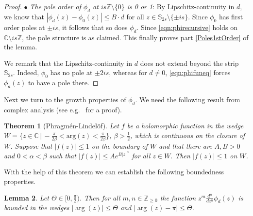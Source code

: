 \documentclass[12pt]{article}
\theoremstyle{plain}
\newtheorem{theorem}{Theorem}
\newtheorem{lemma}[theorem]{Lemma}
\theoremstyle{definition}
\numberwithin{equation}{section}
\numberwithin{theorem}{section}
\newcommand\Zb            {\mathbb{Z}}
\begin{document}
\begin{proof}
\medskip

\noindent
$\bullet$ {\em The pole order of $\phi_d$ at $is\Zb \setminus \{0\}$ is 0 or 1}:
By Lipschitz-continuity in $d$, we know that $|\phi_d(z)-\phi_0(z) |\leq B\cdot d$ for all $z \in \mathbb{S}_{2s} \setminus \{ \pm is\}$. Since $\phi_0$ has first order poles at $\pm is$, it follows that so does $\phi_d$. 
Since \eqref{eqn:phirecursive} holds on $\mathbb{C} \setminus is\mathbb{Z}$, the pole structure is as claimed.
This finally proves part \ref{Poles1stOrder} of the lemma.

We remark that the Lipschitz-continuity in $d$ does not extend beyond the strip $\mathbb{S}_{2s}$. Indeed, 
$\phi_0$ has no pole at $\pm 2is$, whereas for $d\neq 0$,  \eqref{eqn:phifuneq} forces $\phi_d(z)$ to have a pole there. 
\end{proof}

Next we turn to the growth properties of $\phi_d$. We need the following result from complex analysis (see e.g.\ \cite[Ch.\,4,\,Thm.\,3.4]{SteinShakarchi} for a proof).

\begin{theorem}[Phragm\'en-Lindel\"of]\label{phrag-lind}
Let $f$ be a holomorphic function in the wedge $W = \{ z \in \mathbb{C} \,|\, -\tfrac\pi{2\beta} < \mathrm{arg}(z) < \tfrac\pi{2\beta} \}$, $\beta>\tfrac12$, which is continuous on the closure of $W$. Suppose that $|f(z)| \le 1$ on the boundary of $W$ and that there are $A,B>0$ and $0<\alpha<\beta$ such that $|f(z)| \le A e^{B |z|^\alpha}$ for all $z \in W$. Then $|f(z)| \le 1$ on $W$.
\end{theorem}

With the help of this theorem we can establish the following boundedness properties.

\begin{lemma} \label{phibounded} Let $\Theta\in[0,\frac{\pi}{2})$. Then for all $m,n\in\mathbb{Z}_{\ge 0}$ 
the function $z^m\frac{d^n}{dz^n}\phi_d(z)$ is bounded in the wedges $|\arg(z)|\leq\Theta$ and $|\arg(z)-\pi|\leq\Theta$.
\end{lemma}
\end{document}

